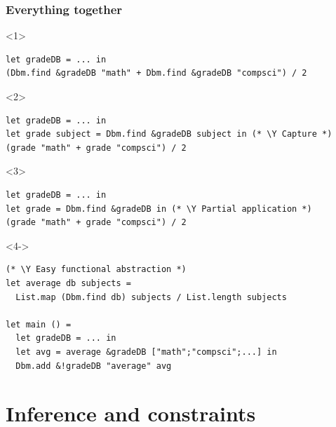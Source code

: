 \documentclass[aspectratio=169,dvipsnames,svgnames,10pt]{beamer}
\newcommand\Y{{\color{Green}{\ding{52}}}}
\begin{document}

  

\begin{frame}[fragile]
  \frametitle{Everything together}
  
  \begin{onlyenv}<1>
\begin{verbatim}
let gradeDB = ... in
(Dbm.find &gradeDB "math" + Dbm.find &gradeDB "compsci") / 2
\end{verbatim}
  \end{onlyenv}
  \begin{onlyenv}<2>
\begin{verbatim}
let gradeDB = ... in
let grade subject = Dbm.find &gradeDB subject in (* \Y Capture *)
(grade "math" + grade "compsci") / 2
\end{verbatim}
  \end{onlyenv}
  \begin{onlyenv}<3>
\begin{verbatim}
let gradeDB = ... in
let grade = Dbm.find &gradeDB in (* \Y Partial application *)
(grade "math" + grade "compsci") / 2
\end{verbatim}
  \end{onlyenv}
  \begin{onlyenv}<4->
\begin{verbatim}
(* \Y Easy functional abstraction *)
let average db subjects = 
  List.map (Dbm.find db) subjects / List.length subjects

let main () =
  let gradeDB = ... in
  let avg = average &gradeDB ["math";"compsci";...] in
  Dbm.add &!gradeDB "average" avg
\end{verbatim}
  \end{onlyenv}
\end{frame}

\section{Inference and constraints}
\end{document}
